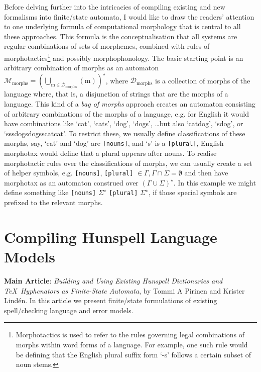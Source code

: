 \documentclass[officiallayout,final]{unihelcompling}
\begin{document}
Before delving further into the intricacies of compiling existing and new
\glspl{formalism} into finite\-/state automata, I would like to draw the
readers' attention to one underlying formula of computational morphology that
is central to all these approaches. This formula is the conceptualisation that
all systems are regular combinations of sets of morphemes, combined with rules
of \gls{morphotactics}\footnote{Morphotactics is used to refer to the rules
    governing legal combinations of morphs within word forms of a language. For
example, one such rule would be defining that the English plural suffix form
`-s' follows a certain subset of noun stems.} and possibly morphophonology.
The basic starting point is an arbitrary combination of morphs as an automaton
$\mathcal{M}_{\mathrm{morphs}} = (\bigcup_{\mathrm{m \in
{\mathcal{D}_\mathrm{morphs}}}} ({\mathrm{m}}))^\star$, where
$\mathcal{D}_\mathrm{morphs}$ is a collection of morphs of the language where,
that is, a disjunction of strings that are the morphs of a language.  This kind
of a \emph{bag of morphs} approach creates an automaton consisting of arbitrary
combinations of the morphs of a language, e.g. for English it would have
combinations like `cat', `cats', `dog', `dogs', \ldots but also `catdog',
`sdog', or `sssdogsdogsscatcat'. To restrict these, we usually define
classifications of these morphs, say, `cat' and `dog' are \texttt{[nouns]}, and
`s' is a \texttt{[plural]}, English morphotax would define that a plural
appears after nouns. To realise morphotactic rules over the classifications of
morphs, we can usually create a set of helper symbols, e.g.  {\texttt{[nouns]},
\texttt{[plural]}} $\in \Gamma, \Gamma \cap \Sigma = \emptyset$ and then have
morphotax as an automaton construed over $(\Gamma \cup \Sigma)^\star$. In this
example we might define something like \texttt{[nouns]} $\Sigma^\star$
\texttt{[plural]} $\Sigma^\star$, if those special symbols are prefixed to the
relevant morphs.

\section{Compiling Hunspell Language Models}
\label{sec:Hunspell}

\textbf{Main Article}: \emph{Building and Using Existing Hunspell Dictionaries
and \TeX\ Hyphenators as Finite-State Automata}, by Tommi A Pirinen and Krister
Lindén.  In this article we present finite\-/state formulations of existing
spell\-/checking language and error models.
\end{document}
